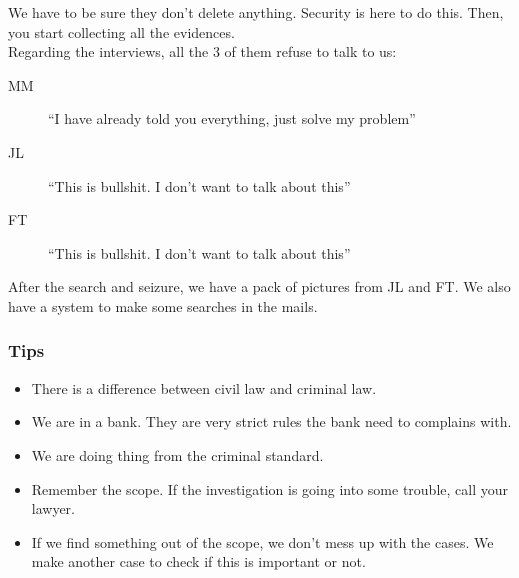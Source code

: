 We have to be sure they don't delete anything. Security is here to do this. Then, you start collecting all the evidences.\\
Regarding the interviews, all the 3 of them refuse to talk to us:
\begin{description}
	\item[MM] \enquote{I have already told you everything, just solve my problem}
	\item[JL] \enquote{This is bullshit. I don't want to talk about this}
	\item[FT] \enquote{This is bullshit. I don't want to talk about this}
\end{description}
After the search and seizure, we have a pack of pictures from JL and FT. We also have a system to make some searches in the mails.
\subsubsection{Tips}
\begin{itemize}
	\item There is a difference between civil law and criminal law.
	\item We are in a bank. They are very strict rules the bank need to complains with.
	\item We are doing thing from the criminal standard.
	\item Remember the scope. If the investigation is going into some trouble, call your lawyer.
	\item If we find something out of the scope, we don't mess up with the cases. We make another case to check if this is important or not.
\end{itemize}